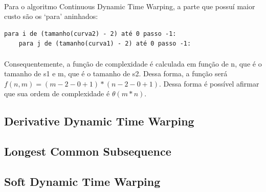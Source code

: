 \documentclass[12pt]{article}
\begin{document}
\paragraph{}Para o algoritmo Continuous Dynamic Time Warping, a parte que possuí maior custo são os ‘para’ aninhados:

\begin{verbatim}
para i de (tamanho(curva2) - 2) até 0 passo -1:
    para j de (tamanho(curva1) - 2) até 0 passo -1:
\end{verbatim}

\paragraph{}Consequentemente, a função de complexidade é calculada em função de n, que é o tamanho de s1 e m, que é o tamanho de s2. Dessa forma, a função será $f(n, m) = (m - 2 - 0 + 1) * (n-2-0 + 1)$. Dessa forma é possível afirmar que sua ordem de complexidade é $\theta(m * n)$.



\subsection{Derivative Dynamic Time Warping}



\subsection{Longest Common Subsequence}



\subsection{Soft Dynamic Time Warping}


\end{document}
